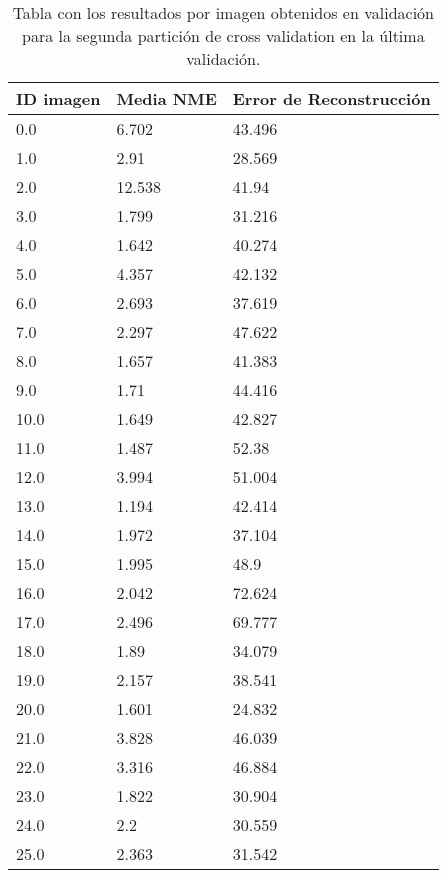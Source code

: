\begin{table}[!ht]
    \centering
    \caption{Tabla con los resultados por imagen obtenidos en validación para la segunda partición de cross validation en la última validación.}
    \begin{tabular}{|l|l|l|}
    \hline
        ID imagen & Media NME & Error de Reconstrucción \\ \hline
        0.0 & 6.702 & 43.496 \\ \hline
        1.0 & 2.91 & 28.569 \\ \hline
        2.0 & 12.538 & 41.94 \\ \hline
        3.0 & 1.799 & 31.216 \\ \hline
        4.0 & 1.642 & 40.274 \\ \hline
        5.0 & 4.357 & 42.132 \\ \hline
        6.0 & 2.693 & 37.619 \\ \hline
        7.0 & 2.297 & 47.622 \\ \hline
        8.0 & 1.657 & 41.383 \\ \hline
        9.0 & 1.71 & 44.416 \\ \hline
        10.0 & 1.649 & 42.827 \\ \hline
        11.0 & 1.487 & 52.38 \\ \hline
        12.0 & 3.994 & 51.004 \\ \hline
        13.0 & 1.194 & 42.414 \\ \hline
        14.0 & 1.972 & 37.104 \\ \hline
        15.0 & 1.995 & 48.9 \\ \hline
        16.0 & 2.042 & 72.624 \\ \hline
        17.0 & 2.496 & 69.777 \\ \hline
        18.0 & 1.89 & 34.079 \\ \hline
        19.0 & 2.157 & 38.541 \\ \hline
        20.0 & 1.601 & 24.832 \\ \hline
        21.0 & 3.828 & 46.039 \\ \hline
        22.0 & 3.316 & 46.884 \\ \hline
        23.0 & 1.822 & 30.904 \\ \hline
        24.0 & 2.2 & 30.559 \\ \hline
        25.0 & 2.363 & 31.542 \\ \hline
    \end{tabular}
    \label{table:Daugmentation_images_3}
\end{table}


